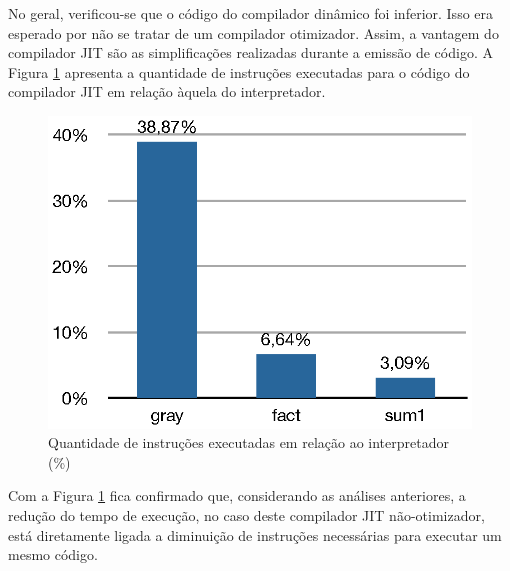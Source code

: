 No geral, verificou-se que o código do compilador dinâmico foi
inferior. Isso era esperado por não se tratar de um compilador otimizador.
Assim, a vantagem do compilador JIT são as simplificações realizadas
durante a emissão de código. A Figura \ref{fig:instrelative} apresenta
a quantidade de instruções executadas para o código do compilador JIT
em relação àquela do interpretador.

\begin{figure}[ht!]
  \centering
  \includegraphics[scale=0.70]{figs/instrelative}
  \caption{Quantidade de instruções executadas em relação ao
    interpretador (\%) \label{fig:instrelative}}
\end{figure}

Com a Figura \ref{fig:instrelative} fica confirmado que,
considerando as análises
anteriores, a redução do
tempo de execução, no caso deste compilador JIT não-otimizador, está
diretamente ligada a
diminuição de instruções necessárias para executar um mesmo
código.
